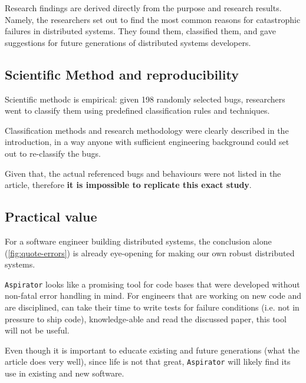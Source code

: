 \documentclass{article}
\begin{document}
Research findings are derived directly from the purpose and research results.
Namely, the researchers set out to find the most common reasons for
catastrophic failures in distributed systems. They found them, classified them,
and gave suggestions for future generations of distributed systems developers.

\subsection{Scientific Method and reproducibility}

Scientific methodc is empirical: given 198 randomly selected bugs,
researchers went to classify them using predefined classification rules and
techniques.

Classification methods and research methodology were clearly described in the
introduction, in a way anyone with sufficient engineering background could set
out to re-classify the bugs.

Given that, the actual referenced bugs and behaviours were not listed in the
article, therefore \textbf{it is impossible to replicate this exact study}.

\subsection{Practical value}

For a software engineer building distributed systems, the conclusion alone
(\ref{fig:quote-errors}) is already eye-opening for making our own robust
distributed systems.

\texttt{Aspirator} looks like a promising tool for code bases that were
developed without non-fatal error handling in mind. For engineers that are
working on new code and are disciplined, can take their time to write tests for
failure conditions (i.e. not in pressure to ship code), knowledge-able and read
the discussed paper, this tool will not be useful.

Even though it is important to educate existing and future generations (what the
article does very well), since life is not that great, \texttt{Aspirator} will
likely find its use in existing and new software.

\printbibliography
\end{document}
